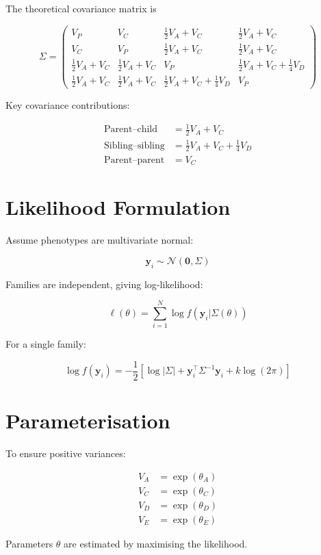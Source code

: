 \documentclass[11pt]{article}
\begin{document}
The theoretical covariance matrix is

\[
\Sigma =
\begin{pmatrix}
V_P & V_C & \tfrac12 V_A + V_C & \tfrac12 V_A + V_C \\
V_C & V_P & \tfrac12 V_A + V_C & \tfrac12 V_A + V_C \\
\tfrac12 V_A + V_C & \tfrac12 V_A + V_C & V_P &
\tfrac12 V_A + V_C + \tfrac14 V_D \\
\tfrac12 V_A + V_C & \tfrac12 V_A + V_C &
\tfrac12 V_A + V_C + \tfrac14 V_D & V_P
\end{pmatrix}
\]

Key covariance contributions:

\begin{align}
\text{Parent--child} &= \tfrac12 V_A + V_C \\
\text{Sibling--sibling} &= \tfrac12 V_A + V_C + \tfrac14 V_D \\
\text{Parent--parent} &= V_C
\end{align}

\section{Likelihood Formulation}

Assume phenotypes are multivariate normal:

\[
\mathbf{y}_i \sim \mathcal{N}(\mathbf{0}, \Sigma)
\]

Families are independent, giving log-likelihood:

\[
\ell(\theta) = \sum_{i=1}^N \log f(\mathbf{y}_i|\Sigma(\theta))
\]

For a single family:

\[
\log f(\mathbf{y}_i) =
-\frac12\left[
\log|\Sigma|
+ \mathbf{y}_i^\top \Sigma^{-1} \mathbf{y}_i
+ k\log(2\pi)
\right]
\]

\section{Parameterisation}

To ensure positive variances:

\begin{align}
V_A &= \exp(\theta_A) \\
V_C &= \exp(\theta_C) \\
V_D &= \exp(\theta_D) \\
V_E &= \exp(\theta_E)
\end{align}

Parameters $\theta$ are estimated by maximising the likelihood.
\end{document}
